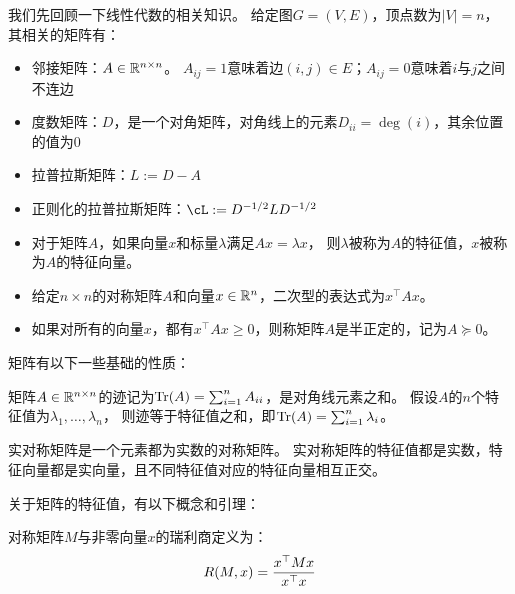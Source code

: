 \bigskip

我们先回顾一下线性代数的相关知识。
给定图$G=(V,E)$，顶点数为$|V|=n$，其相关的矩阵有：
\begin{itemize}
    \item 邻接矩阵：$A\in\mathbb{R}^{n\times n}$。
    $A_{ij}=1$意味着边$(i,j)\in E$；$A_{ij}=0$意味着$i$与$j$之间不连边
    \item 度数矩阵：$D$，是一个对角矩阵，对角线上的元素$D_{ii}=\deg(i)$，其余位置的值为0
    \item 拉普拉斯矩阵：$L:=D-A$
    \item 正则化的拉普拉斯矩阵：$\cL:=D^{-1/2}LD^{-1/2}$
\end{itemize}

\begin{definition}[矩阵的特征值和二次型]
    \quad
    
    \begin{itemize}
        \item 对于矩阵$A$，如果向量$x$和标量$\lambda$满足$Ax=\lambda x$，
        则$\lambda$被称为$A$的特征值，$x$被称为$A$的特征向量。

        \item 给定$n\times n$的对称矩阵$A$和向量$x\in\mathbb{R}^n$，二次型的表达式为$x^\top Ax$。

        \item 如果对所有的向量$x$，都有$x^\top Ax\ge0$，则称矩阵$A$是半正定的，记为$A\succeq0$。
    \end{itemize}
\end{definition}

矩阵有以下一些基础的性质：

\begin{fact}\label{fact:trace}
    矩阵$A\in\mathbb{R}^{n\times n}$的迹记为$\mathrm{Tr}(A)=\sum_{i=1}^n A_{ii}$，是对角线元素之和。
    假设$A$的$n$个特征值为$\lambda_1,\dots,\lambda_n$，
    则迹等于特征值之和，即$\mathrm{Tr}(A)=\sum_{i=1}^n \lambda_i$。
\end{fact}

\begin{theorem}[谱定理]\label{thm:spectral-thm}
    实对称矩阵是一个元素都为实数的对称矩阵。
    实对称矩阵的特征值都是实数，特征向量都是实向量，且不同特征值对应的特征向量相互正交。
\end{theorem}

关于矩阵的特征值，有以下概念和引理：

\begin{definition}
    对称矩阵$M$与非零向量$x$的瑞利商定义为：
    \[R(M,x)=\frac{{x}^{\top}{M}{x}}{{x}^{\top}{}{x}}\]
\end{definition}

